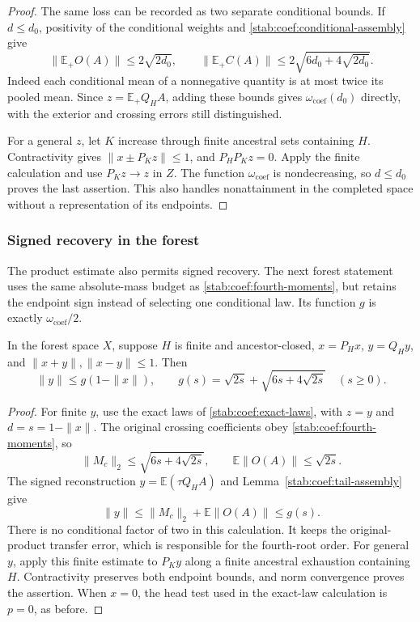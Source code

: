 \begin{proof}
The same loss can be recorded as two separate conditional bounds.
If $d\le d_0$, positivity of the conditional weights and
\eqref{stab:coef:conditional-assembly} give
\begin{equation}\label{stab:coef:fourth-conditional}
 \|\mathbb E_+O(A)\|\le2\sqrt{2d_0},\qquad
 \|\mathbb E_+C(A)\|
 \le2\sqrt{6d_0+4\sqrt{2d_0}}.
\end{equation}
Indeed each conditional mean of a nonnegative quantity is at most
twice its pooled mean. Since $z=\mathbb E_+Q_HA$, adding these
bounds gives $\omega_{\mathrm{coef}}(d_0)$ directly, with the exterior
and crossing errors still distinguished.

For a general $z$, let $K$ increase through finite ancestral sets
containing $H$. Contractivity gives
$\|x\pm P_Kz\|\le1$, and $P_HP_Kz=0$.
Apply the finite calculation and use $P_Kz\to z$ in $Z$.
The function $\omega_{\mathrm{coef}}$ is nondecreasing, so $d\le d_0$
proves the last assertion. This also handles nonattainment in the completed
space without a representation of its endpoints.
\end{proof}

\subsubsection{Signed recovery in the forest}
\label{mola:actual-section}
The product estimate also permits signed recovery. The next forest
statement uses the same absolute-mass budget as
\eqref{stab:coef:fourth-moments}, but retains the endpoint sign instead
of selecting one conditional law. Its function $g$ is exactly
$\omega_{\mathrm{coef}}/2$.

\begin{proposition}\label{mola:actual}
In the forest space $X$, suppose $H$ is finite and ancestor-closed,
$x=P_Hx$, $y=Q_Hy$, and
$\|x+y\|,\|x-y\|\le1$.  Then
\[
 \|y\|\le g(1-\|x\|),\qquad
 g(s)=\sqrt{2s}+\sqrt{6s+4\sqrt{2s}}\quad(s\ge0).
\]
\end{proposition}
\begin{proof}
For finite $y$, use the exact laws of
\eqref{stab:coef:exact-laws}, with $z=y$ and $d=s=1-\|x\|$.
The original crossing coefficients obey
\eqref{stab:coef:fourth-moments}, so
\[
 \|M_c\|_2\le\sqrt{6s+4\sqrt{2s}},\qquad
 \mathbb E\|O(A)\|\le\sqrt{2s}.
\]
The signed reconstruction $y=\mathbb E(\tau Q_HA)$ and
Lemma~\ref{stab:coef:tail-assembly} give
\[
 \|y\|\le\|M_c\|_2+\mathbb E\|O(A)\|\le g(s).
\]
There is no conditional factor of two in this calculation. It keeps
the original-product transfer error, which is responsible for the
fourth-root order. For general $y$, apply this finite estimate to
$P_Ky$ along a finite ancestral exhaustion containing $H$.
Contractivity preserves both endpoint bounds, and norm convergence
proves the assertion. When $x=0$, the head test used in the exact-law
calculation is $p=0$, as before.
\end{proof}

